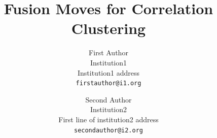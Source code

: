 \documentclass[10pt,twocolumn,letterpaper]{article}
\theoremstyle{definition}
\begin{document}

\title{Fusion Moves for Correlation Clustering}

\author{First Author\\
Institution1\\
Institution1 address\\
{\tt\small firstauthor@i1.org}
\and
Second Author\\
Institution2\\
First line of institution2 address\\
{\tt\small secondauthor@i2.org}
}

\maketitle


\begin{abstract}

%    
%
\end{abstract}
\vspace{-0.5cm}
\end{document}
